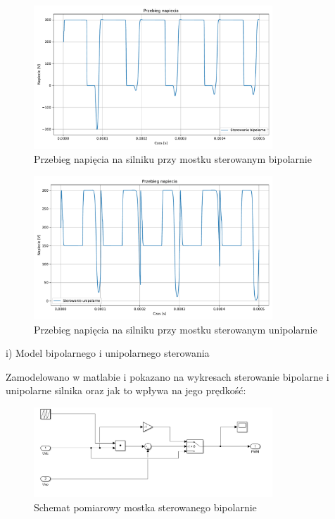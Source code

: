 \documentclass[11pt]{article}
\begin{document}
\begin{figure}[H]
\centering
\includegraphics[width=0.8\textwidth]{aun1_bipolar_motor.pdf}
\caption{Przebieg napięcia na silniku przy mostku sterowanym bipolarnie}
\end{figure}

\begin{figure}[H]
\centering
\includegraphics[width=0.8\textwidth]{aun1_unipolar_motor.pdf}
\caption{Przebieg napięcia na silniku przy mostku sterowanym unipolarnie}
\end{figure}

i) Model bipolarnego i unipolarnego sterowania

Zamodelowano w matlabie i pokazano na wykresach sterowanie bipolarne i unipolarne silnika oraz jak to wpływa na jego prędkość:\\

\begin{figure}[H]
\centering
\includegraphics[width=0.8\textwidth]{aun1_bipolar_schematic.png}
\caption{Schemat pomiarowy mostka sterowanego bipolarnie}
\end{figure}
\end{document}
